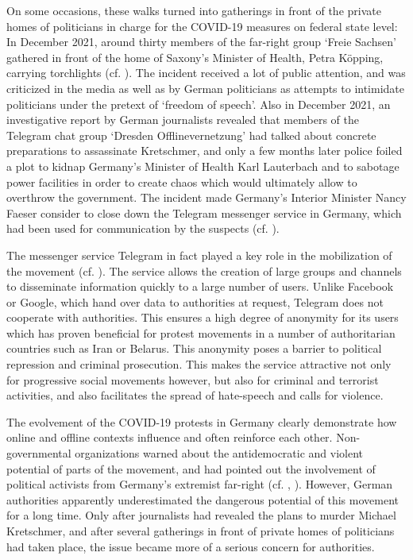 On some occasions, these walks turned into gatherings in front of the private homes of politicians in charge for the COVID-19 measures on federal state level: In December 2021, around thirty members of the far-right group `Freie Sachsen' gathered in front of the home of Saxony's Minister of Health, Petra Köpping, carrying torchlights (cf. \cite{klaus_zdf}). The incident received a lot of public attention, and was criticized in the media as well as by German politicians as attempts to intimidate politicians under the pretext of `freedom of speech'. 
Also in December 2021, an investigative report by German journalists revealed that members of the Telegram chat group `Dresden Offlinevernetzung' had talked about concrete preparations to assassinate Kretschmer, and only a few months later  police foiled a plot to kidnap Germany's Minister of Health Karl Lauterbach and to sabotage power facilities in order to create chaos which would ultimately allow to overthrow the government. The incident made Germany's Interior Minister Nancy Faeser consider to close down the Telegram messenger service in Germany, which had been used for communication by the suspects (cf. \cite{bloomberg}).

The messenger service Telegram in fact played a key role in the mobilization of the movement (cf. \cite{fgz_2020}). The service allows the creation of large groups and channels to disseminate information quickly to a large number of users. Unlike Facebook or Google, which hand over data to authorities at request, Telegram does not cooperate with authorities. This ensures a high degree of anonymity for its users which has proven beneficial for protest movements in a number of authoritarian countries such as Iran or Belarus. This anonymity poses a barrier to political repression and criminal prosecution. This makes the service attractive not only for progressive social movements however, but also for criminal and terrorist activities, and also facilitates the spread of hate-speech and calls for violence. 

The evolvement of the COVID-19 protests in Germany clearly demonstrate how online and offline contexts influence and often reinforce each other. Non-governmental organizations warned about the antidemocratic and violent potential of parts of the movement, and had pointed out the involvement of political activists from Germany's extremist far-right (cf. \cite{bmr_2020}, \cite{fgz_2020}). However, German authorities apparently underestimated the dangerous potential of this movement for a long time. Only after journalists had revealed the plans to murder Michael Kretschmer, and after several gatherings in front of private homes of politicians had taken place, the issue became more of a serious concern for authorities. 

